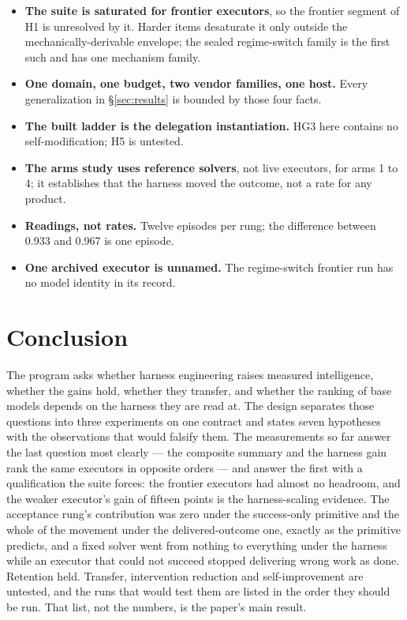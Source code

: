 \begin{itemize}[leftmargin=*]
\item \textbf{The suite is saturated for frontier executors}, so the frontier segment of H1 is unresolved by it. Harder items desaturate it only outside the mechanically-derivable envelope; the sealed regime-switch family is the first such and has one mechanism family.
\item \textbf{One domain, one budget, two vendor families, one host.} Every generalization in \S\ref{sec:results} is bounded by those four facts.
\item \textbf{The built ladder is the delegation instantiation.} HG3 here contains no self-modification; H5 is untested.
\item \textbf{The arms study uses reference solvers}, not live executors, for arms 1 to 4; it establishes that the harness moved the outcome, not a rate for any product.
\item \textbf{Readings, not rates.} Twelve episodes per rung; the difference between 0.933 and 0.967 is one episode.
\item \textbf{One archived executor is unnamed.} The regime-switch frontier run has no model identity in its record.
\end{itemize}

\section{Conclusion}

The program asks whether harness engineering raises measured intelligence, whether the gains hold, whether they transfer, and whether the ranking of base models depends on the harness they are read at. The design separates those questions into three experiments on one contract and states seven hypotheses with the observations that would falsify them. The measurements so far answer the last question most clearly --- the composite summary and the harness gain rank the same executors in opposite orders --- and answer the first with a qualification the suite forces: the frontier executors had almost no headroom, and the weaker executor's gain of fifteen points is the harness-scaling evidence. The acceptance rung's contribution was zero under the success-only primitive and the whole of the movement under the delivered-outcome one, exactly as the primitive predicts, and a fixed solver went from nothing to everything under the harness while an executor that could not succeed stopped delivering wrong work as done. Retention held. Transfer, intervention reduction and self-improvement are untested, and the runs that would test them are listed in the order they should be run. That list, not the numbers, is the paper's main result.

